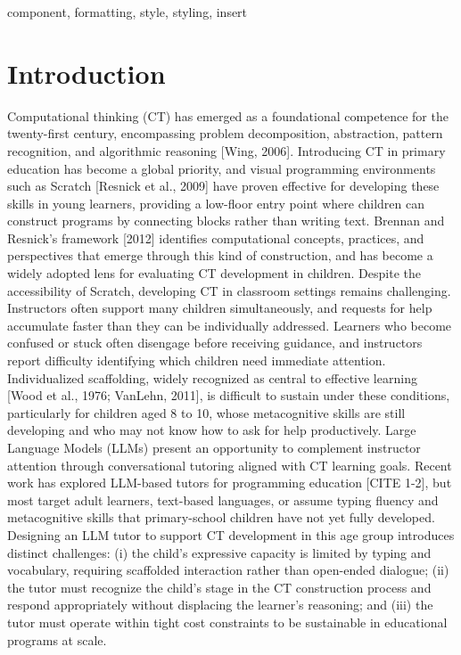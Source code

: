\documentclass[conference]{IEEEtran}
\begin{document}
\begin{IEEEkeywords}
component, formatting, style, styling, insert
\end{IEEEkeywords}

\section{Introduction}
Computational thinking (CT) has emerged as a foundational competence for the twenty-first century, encompassing problem decomposition, abstraction, pattern recognition, and algorithmic reasoning [Wing, 2006]. Introducing CT in primary education has become a global priority, and visual programming environments such as Scratch [Resnick et al., 2009] have proven effective for developing these skills in young learners, providing a low-floor entry point where children can construct programs by connecting blocks rather than writing text. Brennan and Resnick's framework [2012] identifies computational concepts, practices, and perspectives that emerge through this kind of construction, and has become a widely adopted lens for evaluating CT development in children.
Despite the accessibility of Scratch, developing CT in classroom settings remains challenging. Instructors often support many children simultaneously, and requests for help accumulate faster than they can be individually addressed. Learners who become confused or stuck often disengage before receiving guidance, and instructors report difficulty identifying which children need immediate attention. Individualized scaffolding, widely recognized as central to effective learning [Wood et al., 1976; VanLehn, 2011], is difficult to sustain under these conditions, particularly for children aged 8 to 10, whose metacognitive skills are still developing and who may not know how to ask for help productively.
Large Language Models (LLMs) present an opportunity to complement instructor attention through conversational tutoring aligned with CT learning goals. Recent work has explored LLM-based tutors for programming education [CITE 1-2], but most target adult learners, text-based languages, or assume typing fluency and metacognitive skills that primary-school children have not yet fully developed. Designing an LLM tutor to support CT development in this age group introduces distinct challenges: (i) the child's expressive capacity is limited by typing and vocabulary, requiring scaffolded interaction rather than open-ended dialogue; (ii) the tutor must recognize the child's stage in the CT construction process and respond appropriately without displacing the learner's reasoning; and (iii) the tutor must operate within tight cost constraints to be sustainable in educational programs at scale.
\end{document}
